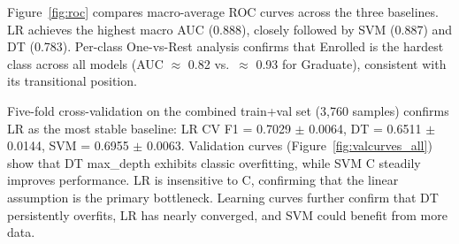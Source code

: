 \documentclass{article}
\begin{document}
\begin{table}[htbp]
    \centering
    \small
    \begin{minipage}[t]{0.56\textwidth}
        \centering
        \caption{Detailed per-model metrics on the test set.}
        \label{tab:nb05_metrics}
    \end{minipage}\hfill
    \begin{minipage}[t]{0.4\textwidth}
        \centering
        \caption{Per-class and Macro AUC.}
        \label{tab:auc_comparison}
    \end{minipage}
\end{table}

Figure~\ref{fig:roc} compares macro-average ROC curves across the three baselines. LR achieves the highest macro AUC (0.888), closely followed by SVM (0.887) and DT (0.783). Per-class One-vs-Rest analysis confirms that Enrolled is the hardest class across all models (AUC $\approx$ 0.82 vs.\ $\approx$ 0.93 for Graduate), consistent with its transitional position.

Five-fold cross-validation on the combined train+val set (3{,}760 samples) confirms LR as the most stable baseline: LR CV F1 = 0.7029 $\pm$ 0.0064, DT = 0.6511 $\pm$ 0.0144, SVM = 0.6955 $\pm$ 0.0063. Validation curves (Figure~\ref{fig:valcurves_all}) show that DT max\_depth exhibits classic overfitting, while SVM C steadily improves performance. LR is insensitive to C, confirming that the linear assumption is the primary bottleneck. Learning curves further confirm that DT persistently overfits, LR has nearly converged, and SVM could benefit from more data.
\end{document}
